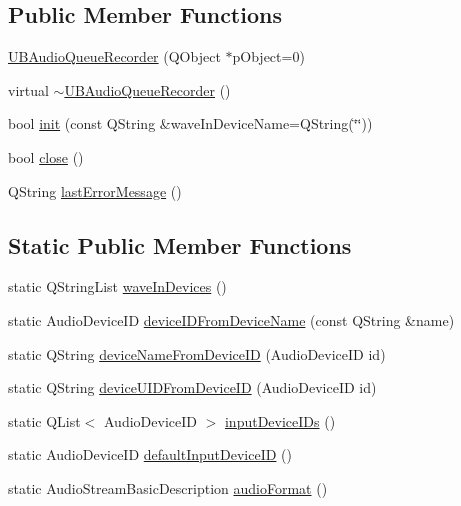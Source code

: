 \subsection*{Public Member Functions}
\begin{DoxyCompactItemize}
\item 
\hyperlink{class_u_b_audio_queue_recorder_ad20c5f3b3053c2a94f079cc777038567}{U\-B\-Audio\-Queue\-Recorder} (Q\-Object $\ast$p\-Object=0)
\item 
virtual \hyperlink{class_u_b_audio_queue_recorder_a524b9243a136a4ddf6cf8615b1d65037}{$\sim$\-U\-B\-Audio\-Queue\-Recorder} ()
\item 
bool \hyperlink{class_u_b_audio_queue_recorder_a2af0edbe33f6bb239f4df5e1318b56b4}{init} (const Q\-String \&wave\-In\-Device\-Name=Q\-String(\char`\"{}\char`\"{}))
\item 
bool \hyperlink{class_u_b_audio_queue_recorder_a1ca07dcb45228c7c4112089f7241deaa}{close} ()
\item 
Q\-String \hyperlink{class_u_b_audio_queue_recorder_ae13ff0c925839fb7ee7e7a49cf0d4f07}{last\-Error\-Message} ()
\end{DoxyCompactItemize}
\subsection*{Static Public Member Functions}
\begin{DoxyCompactItemize}
\item 
static Q\-String\-List \hyperlink{class_u_b_audio_queue_recorder_a3aefba29bf7b27d3fc8acbf116d24f42}{wave\-In\-Devices} ()
\item 
static Audio\-Device\-I\-D \hyperlink{class_u_b_audio_queue_recorder_a48b8fe4e81655b7dd2a3300e190e3dec}{device\-I\-D\-From\-Device\-Name} (const Q\-String \&name)
\item 
static Q\-String \hyperlink{class_u_b_audio_queue_recorder_ac3e3bbaf74904b77908fe405e4f546c7}{device\-Name\-From\-Device\-I\-D} (Audio\-Device\-I\-D id)
\item 
static Q\-String \hyperlink{class_u_b_audio_queue_recorder_a49d2aec69e262d202e9fff287168ef92}{device\-U\-I\-D\-From\-Device\-I\-D} (Audio\-Device\-I\-D id)
\item 
static Q\-List$<$ Audio\-Device\-I\-D $>$ \hyperlink{class_u_b_audio_queue_recorder_a67ef65275e545d178369a82cf5782159}{input\-Device\-I\-Ds} ()
\item 
static Audio\-Device\-I\-D \hyperlink{class_u_b_audio_queue_recorder_adf7c2bcd72393cb8b5949094084f3d87}{default\-Input\-Device\-I\-D} ()
\item 
static Audio\-Stream\-Basic\-Description \hyperlink{class_u_b_audio_queue_recorder_a6c1c163c2243fe2edbe584118f586539}{audio\-Format} ()
\end{DoxyCompactItemize}


